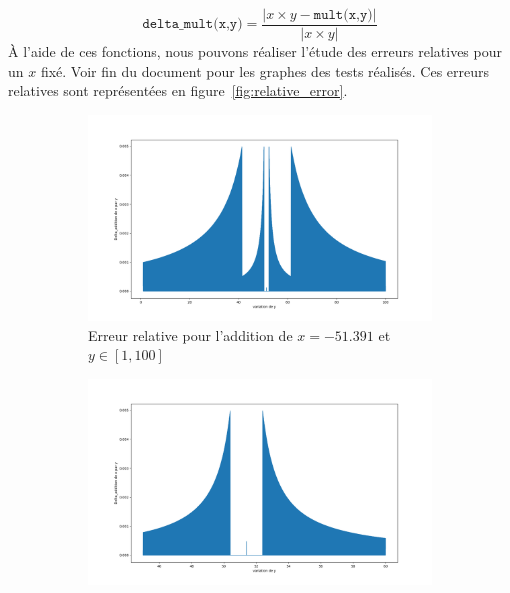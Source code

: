 \documentclass{article}
\begin{document}
\begin{equation}
  \texttt{delta\_mult(x,y)} = \dfrac{\big\vert x \times y - \texttt{mult(x,y)} \big\vert}{\big\vert x\times y \big\vert}
  \label{eq:delta_mult}
\end{equation}
À l'aide de ces fonctions, nous pouvons réaliser l'étude des erreurs relatives pour un $x$ fixé. Voir fin du document pour les graphes des tests réalisés. Ces erreurs relatives sont représentées en figure~\ref{fig:relative_error}.
\vskip 1mm ~

\begin{figure}[ht]
  \centering
  \begin{subfigure}[b]{0.5\textwidth}
    \centering
    \includegraphics[width=\linewidth]{Partie1-delta_add_1-100.png}
    \caption{Erreur relative pour l'addition de $x = -51.391$ et $y\in[1,100]$}
    \label{subfig:delta_add_big}
  \end{subfigure}
  \hfill
  \begin{subfigure}[b]{0.5\textwidth}
    \centering
    \includegraphics[width=\linewidth]{Partie1-delta_add_45-60.png}

\end{subfigure}
\end{figure}
\end{document}
